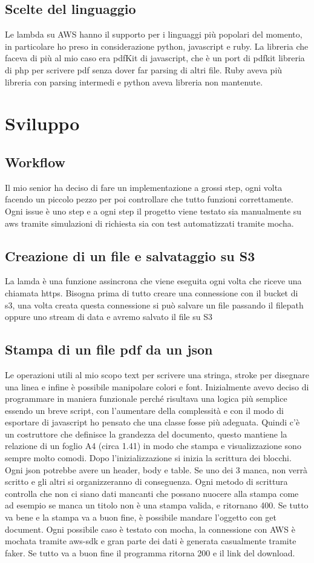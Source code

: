 \documentclass[12pt]{article}
\begin{document}
\subsection{Scelte del linguaggio}
Le lambda su AWS hanno il supporto per i linguaggi più popolari del momento, in
particolare ho preso in considerazione python, javascript e ruby. La libreria
che faceva di più al mio caso era pdfKit di javascript, che è un port di pdfkit
libreria di php per scrivere pdf senza dover far parsing di altri file.
Ruby aveva più libreria con parsing intermedi e python aveva libreria non mantenute.


\section{Sviluppo}
\subsection{Workflow}
Il mio senior ha deciso di fare un implementazione a grossi step, ogni volta
facendo un piccolo pezzo per poi controllare che tutto funzioni correttamente.
Ogni issue è uno step e a ogni step il progetto viene testato sia manualmente su
aws tramite simulazioni di richiesta sia con test automatizzati tramite mocha.

\subsection{Creazione di un file e salvataggio su S3}
La lamda è una funzione assincrona che viene eseguita ogni volta che riceve una
chiamata https. Bisogna prima di tutto creare una connessione con il bucket di s3,
una volta creata questa connessione si può salvare un file passando il filepath
oppure uno stream di data e avremo salvato il file su S3

\subsection{Stampa di un file pdf da un json}
Le operazioni utili al mio scopo text per scrivere una stringa,
stroke per disegnare una linea e infine è possibile manipolare colori e font.
Inizialmente avevo deciso di programmare in maniera funzionale perché risultava
una logica più semplice essendo un breve script, con l'aumentare della complessità
e con il modo di esportare di javascript ho pensato che una classe fosse più adeguata.
Quindi c'è un costruttore che definisce la grandezza del documento, questo mantiene
la relazione di un foglio A4 (circa 1.41) in modo che stampa e visualizzazione sono
sempre molto comodi. Dopo l'inizializzazione si inizia la scrittura dei blocchi.
Ogni json potrebbe avere un header, body e table. Se uno dei 3 manca, non verrà
scritto e gli altri si organizzeranno di conseguenza. Ogni metodo di scrittura
controlla che non ci siano dati mancanti che possano nuocere alla stampa come ad
esempio se manca un titolo non è una stampa valida, e ritornano 400. Se tutto va
bene e la stampa va a buon fine, è possibile mandare l'oggetto con get document.
Ogni possibile caso è testato con mocha, la connessione con AWS è mochata tramite
aws-sdk e gran parte dei dati è generata casualmente tramite faker.
Se tutto va a buon fine il programma ritorna 200 e il link del download.
\end{document}
